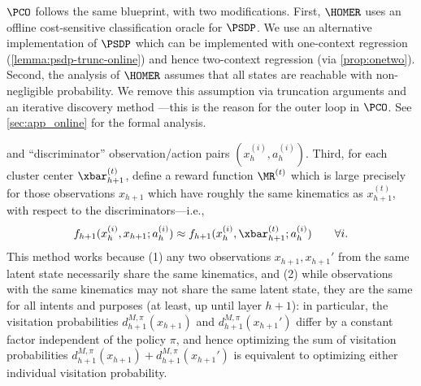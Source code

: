 $\PCO$ follows the same blueprint, with two modifications. First, $\HOMER$ uses an offline cost-sensitive classification oracle for $\PSDP$. We use an alternative implementation of $\PSDP$ \citep{mhammedi2023representation} which can be implemented with one-context regression (\cref{lemma:psdp-trunc-online}) and hence two-context regression (via \cref{prop:onetwo}). Second, the analysis of $\HOMER$ assumes that all states are reachable with non-negligible probability. We remove this assumption via truncation arguments and an iterative discovery method \citep{golowich2024exploring}---this is the reason for the outer loop in $\PCO$. See \cref{sec:app_online} for the formal analysis.

\iffalse 
and ``discriminator'' observation/action pairs $(x_h^{(i)},a_h^{(i)})$. Third, for each cluster center $\xbar^{(t)}_{h+1}$, define a reward function $\MR^{(t)}$ which is large precisely for those observations $x_{h+1}$ which have roughly the same kinematics as $x^{(t)}_{h+1}$, with respect to the discriminators---i.e.,
\[f_{h+1}(x_h^{(i)}, x_{h+1}; a_h^{(i)}) \approx f_{h+1}(x_h^{(i)}, \xbar_{h+1}^{(t)}; a_h^{(i)}) \qquad \forall i.\]
This method works because (1) any two observations $x_{h+1},x_{h+1}'$ from the same latent state necessarily share the same kinematics, and (2) while observations with the same kinematics may not share the same latent state, they are the same for all intents and purposes (at least, up until layer $h+1$): in particular, the visitation probabilities $d^{M,\pi}_{h+1}(x_{h+1})$ and $d^{M,\pi}_{h+1}(x_{h+1}')$ differ by a constant factor independent of the policy $\pi$, and hence optimizing the sum of visitation probabilities $d^{M,\pi}_{h+1}(x_{h+1}) + d^{M,\pi}_{h+1}(x_{h+1}')$ is equivalent to optimizing either individual visitation probability.

